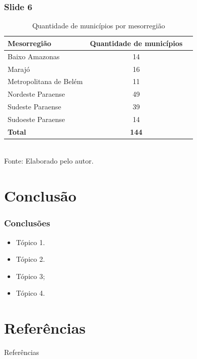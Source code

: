 \documentclass{beamer}
\begin{document}
\begin{frame}
    \frametitle{Slide 6}
    
    \begin{table}
	\centering
	\caption{Quantidade de municípios por mesorregião}
	\label{quadro:tabela1}
    \scriptsize
	 \begin{tabular}{lcc}
		\toprule
		\textbf{Mesorregião} & \textbf{Quantidade de municípios}\\
		\midrule
		Baixo Amazonas & 14 \\
		Marajó & 16\\
    	Metropolitana de Belém & 11\\
		Nordeste Paraense & 49\\
		Sudeste Paraense & 39\\
		Sudoeste Paraense & 14\\
		\textbf{Total}  & \textbf{144}\\
		\bottomrule
	\end{tabular}\\
	{\footnotesize Fonte: Elaborado pelo autor. }
\end{table}
\end{frame} 

\section{Conclusão}


\begin{frame}
    \frametitle{Conclusões}
    \justifying
     \begin{itemize}[<+->]
        \item Tópico 1.
        \item Tópico 2.
        \item Tópico 3;
        \item Tópico 4.
     \end{itemize}
\end{frame} 


\section{Referências}

\begin{frame}[allowframebreaks]{Referências}

\end{frame}
\end{document}
